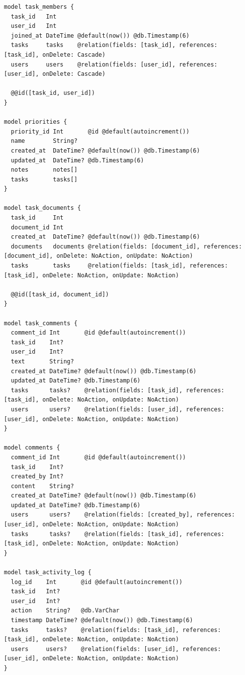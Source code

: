\begin{listing}[H]
\begin{verbatim}
model task_members {
  task_id   Int
  user_id   Int
  joined_at DateTime @default(now()) @db.Timestamp(6)
  tasks     tasks    @relation(fields: [task_id], references: [task_id], onDelete: Cascade)
  users     users    @relation(fields: [user_id], references: [user_id], onDelete: Cascade)

  @@id([task_id, user_id])
}

model priorities {
  priority_id Int       @id @default(autoincrement())
  name        String?
  created_at  DateTime? @default(now()) @db.Timestamp(6)
  updated_at  DateTime? @db.Timestamp(6)
  notes       notes[]
  tasks       tasks[]
}

model task_documents {
  task_id     Int
  document_id Int
  created_at  DateTime? @default(now()) @db.Timestamp(6)
  documents   documents @relation(fields: [document_id], references: [document_id], onDelete: NoAction, onUpdate: NoAction)
  tasks       tasks     @relation(fields: [task_id], references: [task_id], onDelete: NoAction, onUpdate: NoAction)

  @@id([task_id, document_id])
}

model task_comments {
  comment_id Int       @id @default(autoincrement())
  task_id    Int?
  user_id    Int?
  text       String?
  created_at DateTime? @default(now()) @db.Timestamp(6)
  updated_at DateTime? @db.Timestamp(6)
  tasks      tasks?    @relation(fields: [task_id], references: [task_id], onDelete: NoAction, onUpdate: NoAction)
  users      users?    @relation(fields: [user_id], references: [user_id], onDelete: NoAction, onUpdate: NoAction)
}

model comments {
  comment_id Int       @id @default(autoincrement())
  task_id    Int?
  created_by Int?
  content    String?
  created_at DateTime? @default(now()) @db.Timestamp(6)
  updated_at DateTime? @db.Timestamp(6)
  users      users?    @relation(fields: [created_by], references: [user_id], onDelete: NoAction, onUpdate: NoAction)
  tasks      tasks?    @relation(fields: [task_id], references: [task_id], onDelete: NoAction, onUpdate: NoAction)
}

model task_activity_log {
  log_id    Int       @id @default(autoincrement())
  task_id   Int?
  user_id   Int?
  action    String?   @db.VarChar
  timestamp DateTime? @default(now()) @db.Timestamp(6)
  tasks     tasks?    @relation(fields: [task_id], references: [task_id], onDelete: NoAction, onUpdate: NoAction)
  users     users?    @relation(fields: [user_id], references: [user_id], onDelete: NoAction, onUpdate: NoAction)
}
\end{verbatim}
\caption{Prisma -- Aufgaben-Modelle (\texttt{tasks}, \texttt{task\_members}, \texttt{task\_templates} u.\,w.)}
\label{lst:prisma_tasks}
\end{listing}

